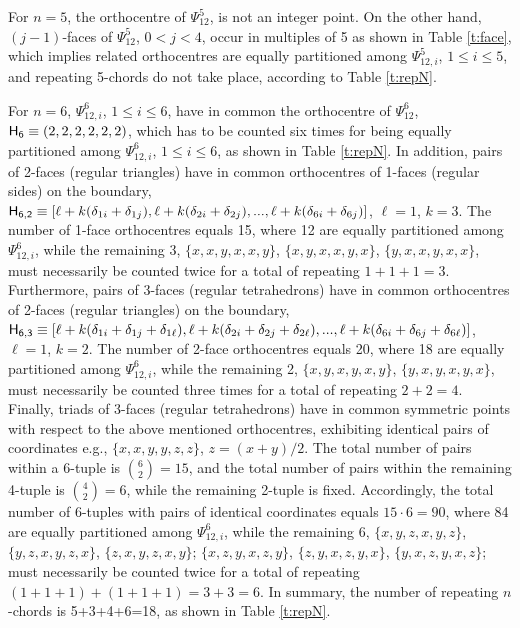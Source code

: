 \documentclass[12pt,a4paper]{article}
\begin{document}
For $n=5$, the orthocentre of $\Psi_{12}^5$, is not an integer point.   On the
other hand, $(j-1)$-faces of  $\Psi_{12}^5$, $0<j<4$, occur in multiples of 5
as shown in Table \ref{t:face}, which implies related orthocentres are
equally partitioned among $\Psi_{12,i}^5$, $1\le i\le5$, and repeating
5-chords do not take place, according to Table \ref{t:repN}.

For $n=6$, $\Psi_{12,i}^6$, $1\le i\le6$, have in common the orthocentre of
$\Psi_{12}^6$, ${\sf H_6}\equiv(2,2,2,2,2,2)$, which has to be counted six times
for being equally partitioned among $\Psi_{12,i}^6$,
$1\le i\le6$, as shown in Table \ref{t:repN}.    In addition, pairs of 2-faces
(regular triangles) have in common orthocentres of 1-faces (regular sides) on
the boundary, ${\sf H_{6,2}}\equiv[\ell+k(\delta_{1i}+\delta_{1j}),
\ell+k(\delta_{2i}+\delta_{2j}),...,\ell+k(\delta_{6i}+\delta_{6j})]$,
$\ell=1$, $k=3$.   The number of 1-face orthocentres equals 15,
where 12 are equally partitioned among $\Psi_{12,i}^6$, while the remaining 3,
$\{x,x,y,x,x,y\}$, $\{x,y,x,x,y,x\}$, $\{y,x,x,y,x,x\}$, must necessarily be
counted twice
for a total of repeating $1+1+1=3$.   Furthermore, pairs of 3-faces (regular
tetrahedrons) have in common orthocentres of 2-faces (regular triangles) on
the boundary,
${\sf H_{6,3}}\equiv[\ell+k(\delta_{1i}+\delta_{1j}+\delta_{1\ell}),
\ell+k(\delta_{2i}+\delta_{2j}+\delta_{2\ell}),...,
\ell+k(\delta_{6i}+\delta_{6j}+\delta_{6\ell})]$,
$\ell=1$, $k=2$.   The number of 2-face orthocentres equals 20,
where 18 are equally partitioned among $\Psi_{12,i}^6$, while the remaining 2,
$\{x,y,x,y,x,y\}$, $\{y,x,y,x,y,x\}$, must necessarily be counted three
times for a total of repeating $2+2=4$.   Finally, triads of 3-faces (regular
tetrahedrons) have in common symmetric points with respect to the above
mentioned orthocentres, exhibiting identical pairs of coordinates e.g.,
$\{x,x,y,y,z,z\}$, $z=(x+y)/2$.   The total number of pairs within a 6-tuple
is ${6\choose2}=15$, and the total number of pairs within the remaining
4-tuple is ${4\choose2}=6$, while the remaining 2-tuple is fixed.
Accordingly, the
total number of 6-tuples with pairs of identical coordinates equals
$15\cdot6=90$, where 84 are equally partitioned among $\Psi_{12,i}^6$, while
the remaining 6, $\{x,y,z,x,y,z\}$, $\{y,z,x,y,z,x\}$, $\{z,x,y,z,x,y\}$;
$\{x,z,y,x,z,y\}$, $\{z,y,x,z,y,x\}$, $\{y,x,z,y,x,z\}$; must necessarily be
counted twice for a total of repeating $(1+1+1)+(1+1+1)=3+3=6$.   In summary,
the number of repeating $n$-chords is 5+3+4+6=18, as shown in Table
\ref{t:repN}.
\end{document}
